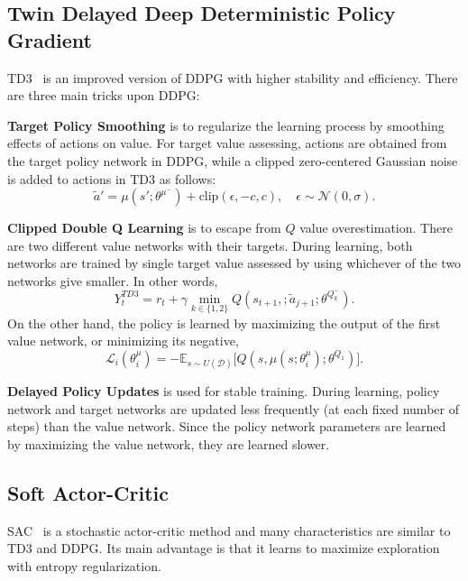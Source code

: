 \documentclass[a4paper, 12pt]{article} %
\begin{document}
\subsection{Twin Delayed Deep Deterministic Policy Gradient}
TD3~\cite{fujimoto_addressing_2018} is an improved version of DDPG with higher stability and efficiency. 
There are three main tricks upon DDPG: 

\textbf{Target Policy Smoothing} is to regularize the learning process by smoothing effects of actions on value. For target value assessing, actions are obtained from the target policy network in DDPG, while a clipped zero-centered Gaussian noise is added to actions in TD3 as follows: 
\begin{equation}
\label{eqn:td3_target_action}
\widetilde{a}' = \mu(s';\theta^{\mu^-}) + \text{clip}(\epsilon, -c, c), \quad \epsilon \sim \mathcal{N}(0, \sigma).
\end{equation}

\textbf{Clipped Double Q Learning} is to escape from $Q$ value overestimation. 
There are two different value networks with their targets. 
During learning, both networks are trained by single target value assessed by using whichever of the two networks give smaller. 
In other words, 
\begin{equation}
\label{eqn:td3_target}
Y_t^{TD3} = r_t + \gamma \min_{k\in\{1,2\}} Q(s_{t+1}, ;\widetilde{a}_{j+1};\theta^{Q_k^-}).
\end{equation}
On the other hand, the policy is learned by maximizing the output of the first value network, or minimizing its negative,
\begin{equation}
\label{eqn:td3_policy_loss}
\mathcal{L}_i(\theta^\mu_i) = -\mathbb{E}_{s \sim U(\mathcal{D})} \Big[ Q(s, \mu(s;\theta^\mu_i);\theta^{Q_1}) \Big].
\end{equation} 

\textbf{Delayed Policy Updates} is used for stable training. 
During learning, policy network and target networks are updated less frequently (at each fixed number of steps) than the value network. 
Since the policy network parameters are learned by maximizing the value network, they are learned slower.  

\subsection{Soft Actor-Critic}
SAC~\cite{haarnoja_soft_2018} is a stochastic actor-critic method and many characteristics are similar to TD3 and DDPG. Its main advantage is that it learns to maximize exploration with entropy regularization. 
\end{document}
